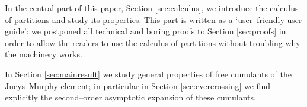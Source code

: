 \documentclass[12pt,dvips]{amsart}
\numberwithin{equation}{section} \numberwithin{figure}{section}
\theoremstyle{plain}
\theoremstyle{definition}
\theoremstyle{remark}
\begin{document}

In the central part of this paper, Section \ref{sec:calculus}, we
introduce the calculus of partitions and study its properties. This
part is written as a `user--friendly user guide': we postponed all
technical and boring proofs to Section \ref{sec:proofs} in order to
allow the readers to use the calculus of partitions without
troubling why the machinery works.



%
%

In Section \ref{sec:mainresult} we study general properties of free
cumulants of the Jucys--Murphy element; in particular in Section
\ref{sec:evercrossing} we find explicitly the second--order
asymptotic expansion of these cumulants.

\end{document}

